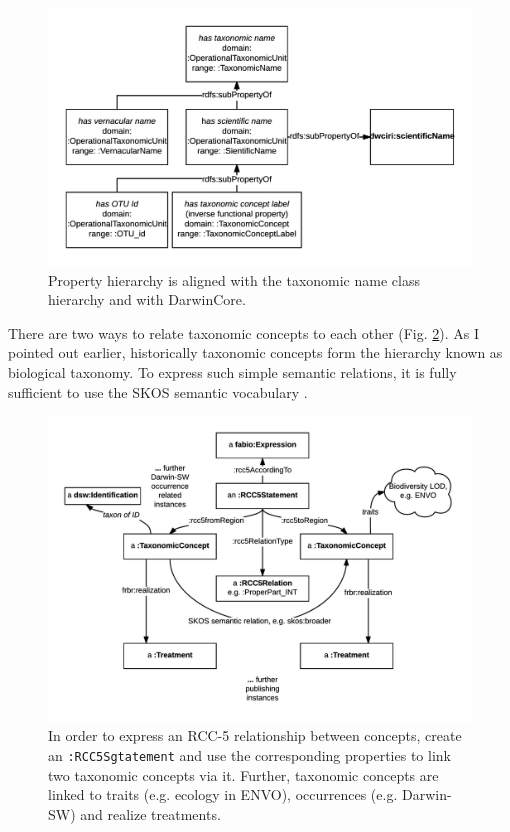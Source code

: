 \begin{figure}[h!]
\centering
  \includegraphics[width=\textwidth]{Figures/name-property-hierarchy}
  \decoRule
  \caption[axonomic name property hierarchy diagram.]
  {Property hierarchy is aligned with the taxonomic name class hierarchy and with DarwinCore.}
  \label{name-property-hierarchy}
\end{figure}

There are two ways to relate taxonomic concepts to each other (Fig. \ref{taxonomic-concept-relationships-diagram}). As I pointed out earlier, historically taxonomic concepts form the hierarchy known as biological taxonomy. To express such simple semantic relations, it is fully sufficient to use the SKOS semantic vocabulary \cite{miles_skos_nodate}. 

\begin{figure}[h!]
\centering
  \includegraphics[width=\textwidth]{Figures/taxonomic-concept-relationships-diagram}
  \decoRule
  \caption[Taxonomic concept relationships diagram.]{In order to express an RCC-5 relationship between concepts, create an {\tt :RCC5Sgtatement} and use the corresponding properties to link two taxonomic concepts via it. Further, taxonomic concepts are linked to traits (e.g. ecology in ENVO), occurrences (e.g. Darwin-SW) and realize treatments.}
  \label{taxonomic-concept-relationships-diagram}
\end{figure}

